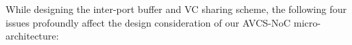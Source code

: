 \documentclass[10pt,conference]{IEEEtran}
\begin{document}
While designing the inter-port buffer and VC sharing scheme, the following four issues profoundly affect the design consideration of our AVCS-NoC micro-architecture:

\end{document}
